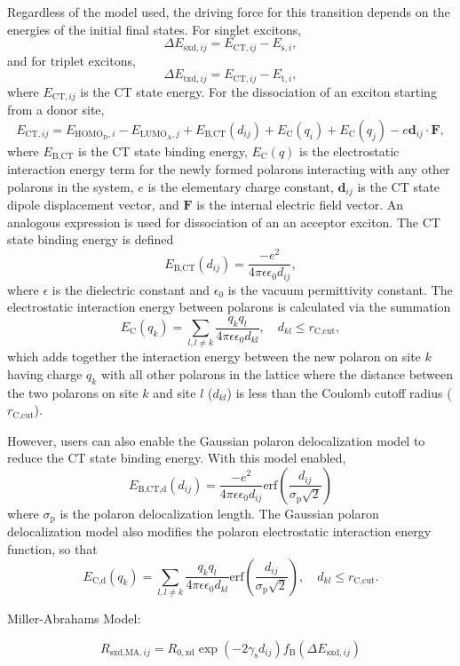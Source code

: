 \documentclass[%
 reprint,onecolumn,notitlepage,
superscriptaddress,longbibliography,
 amsmath,amssymb,
 aps,rmp,floatfix,
]{revtex4-1}
\begin{document}
Regardless of the model used, the driving force for this transition depends on the energies of the initial final states. For singlet excitons,
$$\Delta E_{\text{sxd},ij} = E_{\text{CT},ij} - E_{\text{s},i},$$
and for triplet excitons,
$$\Delta E_{\text{txd},ij} = E_{\text{CT},ij} - E_{\text{t},i},$$
where $E_{\text{CT},ij}$ is the CT state energy. 
For the dissociation of an exciton starting from a donor site, 
$$E_{\text{CT},ij} = E_{\text{HOMO}_\text{D},i} - E_{\text{LUMO}_\text{A},j} + E_\text{B,CT} \left( d_{ij} \right) + E_\text{C}(q_i) + E_\text{C}(q_j) - e \mathbf{d}_{ij} \cdot \mathbf{F},$$
where $E_\text{B,CT}$ is the CT state binding energy, $E_\text{C}(q)$ is the electrostatic interaction energy term for the newly formed polarons interacting with any other polarons in the system, $e$ is the elementary charge constant, $\mathbf{d}_{ij}$ is the CT state dipole displacement vector, and $\mathbf{F}$ is the internal electric field vector.
An analogous expression is used for dissociation of an an acceptor exciton.
The CT state binding energy is defined
$$E_\text{B,CT} \left( d_{ij} \right) = \frac{-e^2}{4 \pi \epsilon \epsilon_0 d_{ij}},$$
where $\epsilon$ is the dielectric constant and $\epsilon_0$ is the vacuum permittivity constant.
The electrostatic interaction energy between polarons is calculated via the summation
$$E_\text{C}(q_k) = \sum_{l,l\neq k} \frac{q_k q_l}{4 \pi \epsilon \epsilon_0 d_{kl}}, \quad d_{kl} \leq r_\text{C,cut},$$
which adds together the interaction energy between the new polaron on site $k$ having charge $q_k$ with all other polarons in the lattice where the distance between the two polarons on site $k$ and site $l$ ($d_{kl}$) is less than the Coulomb cutoff radius ($r_\text{C,cut}$).

However, users can also enable the Gaussian polaron delocalization model\cite{gagorik2015afm} to reduce the CT state binding energy. 
With this model enabled,
$$E_\text{B,CT,d} \left( d_{ij} \right) = \frac{-e^2}{4 \pi \epsilon \epsilon_0 d_{ij}} \text{erf}\left(\frac{d_{ij}}{\sigma_\text{p}\sqrt{2}}\right)$$
where $\sigma_\text{p}$ is the polaron delocalization length.
The Gaussian polaron delocalization model also modifies the polaron electrostatic interaction energy function, so that
$$E_\text{C,d}(q_k) = \sum_{l,l\neq k} \frac{q_k q_l}{4 \pi \epsilon \epsilon_0 d_{kl}}\text{erf}\left( \frac{d_{ij}}{\sigma_\text{p}\sqrt{2}}\right), \quad d_{kl} \leq r_\text{C,cut}.$$

Miller-Abrahams Model:

$$R_{\text{sxd,MA},ij} = R_{0,\text{xd}} \exp{\left(- 2 \gamma_{\text{s}} d_{ij} \right)} f_\text{B} \left( \Delta E_{\text{sxd},ij}\right)$$
\end{document}
